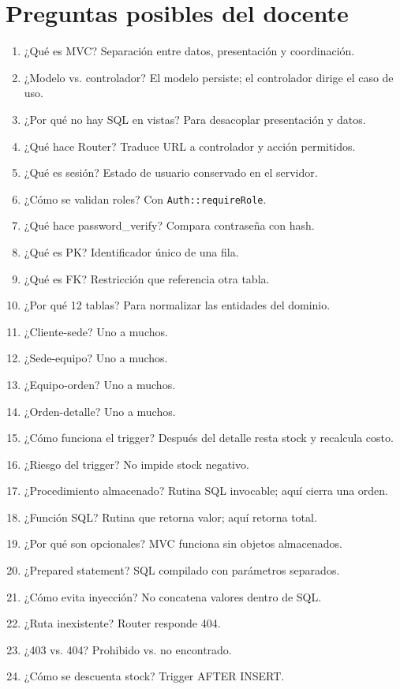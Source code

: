 \documentclass[11pt,a4paper]{report}
\begin{document}
\chapter{Preguntas posibles del docente}
\begin{enumerate}[leftmargin=*]
\item ¿Qué es MVC? Separación entre datos, presentación y coordinación.
\item ¿Modelo vs. controlador? El modelo persiste; el controlador dirige el caso de uso.
\item ¿Por qué no hay SQL en vistas? Para desacoplar presentación y datos.
\item ¿Qué hace Router? Traduce URL a controlador y acción permitidos.
\item ¿Qué es sesión? Estado de usuario conservado en el servidor.
\item ¿Cómo se validan roles? Con \texttt{Auth::requireRole}.
\item ¿Qué hace password\_verify? Compara contraseña con hash.
\item ¿Qué es PK? Identificador único de una fila.
\item ¿Qué es FK? Restricción que referencia otra tabla.
\item ¿Por qué 12 tablas? Para normalizar las entidades del dominio.
\item ¿Cliente-sede? Uno a muchos.
\item ¿Sede-equipo? Uno a muchos.
\item ¿Equipo-orden? Uno a muchos.
\item ¿Orden-detalle? Uno a muchos.
\item ¿Cómo funciona el trigger? Después del detalle resta stock y recalcula costo.
\item ¿Riesgo del trigger? No impide stock negativo.
\item ¿Procedimiento almacenado? Rutina SQL invocable; aquí cierra una orden.
\item ¿Función SQL? Rutina que retorna valor; aquí retorna total.
\item ¿Por qué son opcionales? MVC funciona sin objetos almacenados.
\item ¿Prepared statement? SQL compilado con parámetros separados.
\item ¿Cómo evita inyección? No concatena valores dentro de SQL.
\item ¿Ruta inexistente? Router responde 404.
\item ¿403 vs. 404? Prohibido vs. no encontrado.
\item ¿Cómo se descuenta stock? Trigger AFTER INSERT.

\end{enumerate}
\end{document}
